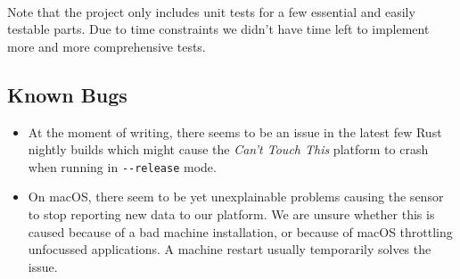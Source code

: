 \documentclass{standalone}
\begin{document}
  \paragraph{}
  Note that the project only includes unit tests for a few essential and easily
  testable parts. Due to time constraints we didn't have time left to implement
  more and more comprehensive tests.

  \subsection{Known Bugs}
  \begin{itemize}
    \tightlist{}
    \item At the moment of writing, there seems to be an issue in the latest
      few Rust nightly builds which might cause the \textit{Can't Touch This}
      platform to crash when running in \verb_--release_ mode.
    \item On macOS, there seem to be yet unexplainable problems causing the sensor
      to stop reporting new data to our platform. We are unsure whether this is
      caused because of a bad machine installation, or because of macOS
      throttling unfocussed applications. A machine restart usually temporarily
      solves the issue.
  \end{itemize}
\end{document}
